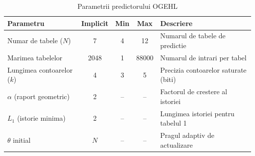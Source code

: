 \begin{table}[H]
    \centering
    \small
    \begin{tabular}{|l|c|c|c|l|}
        \hline
        \textbf{Parametru} & \textbf{Implicit} & \textbf{Min} & \textbf{Max} & \textbf{Descriere} \\
        \hline
        Numar de tabele ($N$)      & 7    & 4 & 12    & Numarul de tabele de predictie \\
        Marimea tabelelor          & 2048 & 1 & 88000 & Numarul de intrari per tabel \\
        Lungimea contoarelor ($k$) & 4    & 3 & 5     & Precizia contoarelor saturate (biti) \\
        \hline
        $\alpha$ (raport geometric) & 2   & -- & --   & Factorul de crestere al istoriei \\
        $L_1$ (istorie minima)      & 2   & -- & --   & Lungimea istoriei pentru tabelul 1 \\
        $\theta$ initial            & $N$ & -- & --   & Pragul adaptiv de actualizare \\
        \hline
    \end{tabular}
    \caption{Parametrii predictorului OGEHL}
    \label{tab:params}
\end{table}

